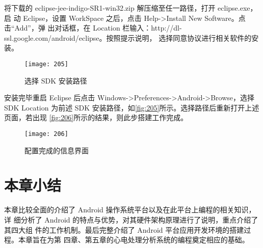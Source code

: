 将下载的 eclipse-jee-indigo-SR1-win32.zip 解压缩至任一路径，打开 eclipse.exe，启
动 Eclipse，设置 WorkSpace 之后，点击 Help->Install New Software。点击“Add”，弹
出对话框，在 Location 栏输入：http://dl-ssl.google.com/android/eclipse。按照提示说明，
选择同意协议进行相关软件的安装。

\begin{figure}[htbp]
    \centering
    \texttt{[image: 205]}
    \caption{\label{fig:205}选择 SDK 安装路径}
\end{figure}

安装完毕重启 Eclipse 后点击 Windows->Preferences->Android->Browse，选择 SDK
Location 为前述 SDK 安装路径，如\autoref{fig:205}所示。选择路径后重新打开上述页面，若出现
\autoref{fig:206}所示的结果，则此步搭建工作完成。

\begin{figure}[htbp]
    \centering
    \texttt{[image: 206]}
    \caption{\label{fig:206}配置完成的信息界面}
\end{figure}

\section{本章小结}
本章比较全面的介绍了 Android 操作系统平台以及在此平台上编程的相关知识，详
细分析了 Android 的特点与优势，对其硬件架构原理进行了说明，重点介绍了其四大组
件的工作机制。最后完整介绍了 Android 平台应用开发环境的搭建过程。本章旨在为第
四章、第五章的心电处理分析系统的编程奠定相应的基础。